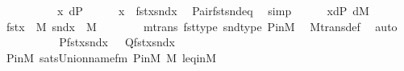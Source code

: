 \begin{isabellebody}
\ \ \isamarkupfalse%
\ {\isacharminus}{\kern0pt}\isanewline
\ \ \ \ \isamarkupfalse%
\ {\isacartoucheopen}x{\isasymin}\ {\isacharquery}{\kern0pt}d{\isasymtimes}P{\isacartoucheclose}\isanewline
\ \ \ \ \isamarkupfalse%
\ {\isachardoublequoteopen}x\ {\isacharequal}{\kern0pt}\ {\isasymlangle}fst{\isacharparenleft}{\kern0pt}x{\isacharparenright}{\kern0pt}{\isacharcomma}{\kern0pt}snd{\isacharparenleft}{\kern0pt}x{\isacharparenright}{\kern0pt}{\isasymrangle}{\isachardoublequoteclose}\ \isamarkupfalse%
\ Pair{\isacharunderscore}{\kern0pt}fst{\isacharunderscore}{\kern0pt}snd{\isacharunderscore}{\kern0pt}eq\ \isamarkupfalse%
\ simp\isanewline
\ \ \ \ \isamarkupfalse%
\ {\isacartoucheopen}x{\isasymin}{\isacharquery}{\kern0pt}d{\isasymtimes}P{\isacartoucheclose}\ {\isacartoucheopen}{\isacharquery}{\kern0pt}d{\isasymin}M{\isacartoucheclose}\isanewline
\ \ \ \ \isamarkupfalse%
\ {\isachardoublequoteopen}fst{\isacharparenleft}{\kern0pt}x{\isacharparenright}{\kern0pt}\ {\isasymin}\ M{\isachardoublequoteclose}\ {\isachardoublequoteopen}snd{\isacharparenleft}{\kern0pt}x{\isacharparenright}{\kern0pt}\ {\isasymin}\ M{\isachardoublequoteclose}\isanewline
\ \ \ \ \ \ \isamarkupfalse%
\ mtrans\ fst{\isacharunderscore}{\kern0pt}type\ snd{\isacharunderscore}{\kern0pt}type\ P{\isacharunderscore}{\kern0pt}in{\isacharunderscore}{\kern0pt}M\ \isamarkupfalse%
\ M{\isacharunderscore}{\kern0pt}trans{\isacharunderscore}{\kern0pt}def\ \isamarkupfalse%
\ auto\isanewline
\ \ \ \ \isamarkupfalse%
\isanewline
\ \ \ \ \isamarkupfalse%
\ {\isachardoublequoteopen}{\isacharquery}{\kern0pt}P{\isacharparenleft}{\kern0pt}{\isasymlangle}fst{\isacharparenleft}{\kern0pt}x{\isacharparenright}{\kern0pt}{\isacharcomma}{\kern0pt}snd{\isacharparenleft}{\kern0pt}x{\isacharparenright}{\kern0pt}{\isasymrangle}{\isacharparenright}{\kern0pt}\ {\isasymlongleftrightarrow}\ \ {\isacharquery}{\kern0pt}Q{\isacharparenleft}{\kern0pt}{\isasymlangle}fst{\isacharparenleft}{\kern0pt}x{\isacharparenright}{\kern0pt}{\isacharcomma}{\kern0pt}snd{\isacharparenleft}{\kern0pt}x{\isacharparenright}{\kern0pt}{\isasymrangle}{\isacharparenright}{\kern0pt}{\isachardoublequoteclose}\isanewline
\ \ \ \ \ \ \isamarkupfalse%
\ P{\isacharunderscore}{\kern0pt}in{\isacharunderscore}{\kern0pt}M\ sats{\isacharunderscore}{\kern0pt}Union{\isacharunderscore}{\kern0pt}name{\isacharunderscore}{\kern0pt}fm\ P{\isacharunderscore}{\kern0pt}in{\isacharunderscore}{\kern0pt}M\ {\isacartoucheopen}{\isasymtau}{\isasymin}M{\isacartoucheclose}\ leq{\isacharunderscore}{\kern0pt}in{\isacharunderscore}{\kern0pt}M\ \isamarkupfalse%

\end{isabellebody}

